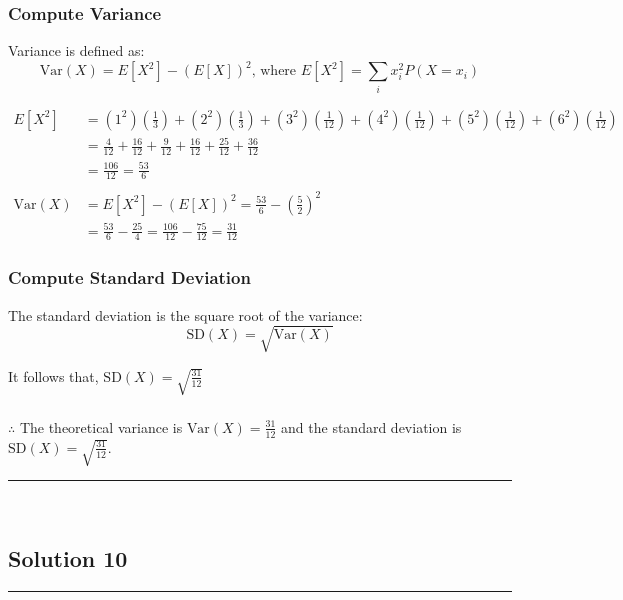 \documentclass{article}
\begin{document}
\subsubsection*{Compute Variance}

\parbox{\textwidth}{Variance is defined as:
$$\text{Var}(X) = E[X^2] - (E[X])^2\text{, where } E[X^2] = \sum_{i} x_i^2 P(X=x_i)$$ 
}
\begin{align*}
E[X^2] &= (1^2)\left(\frac{1}{3}\right) + (2^2)\left(\frac{1}{3}\right) + (3^2)\left(\frac{1}{12}\right) + (4^2)\left(\frac{1}{12}\right) + (5^2)\left(\frac{1}{12}\right) + (6^2)\left(\frac{1}{12}\right) \\
&= \frac{4}{12} + \frac{16}{12} + \frac{9}{12} + \frac{16}{12} + \frac{25}{12} + \frac{36}{12} \\
&= \frac{106}{12} = \frac{53}{6} \\
\\
\text{Var}(X) &= E[X^2] - (E[X])^2 = \frac{53}{6} - \left(\frac{5}{2}\right)^2 \\
&= \frac{53}{6} - \frac{25}{4} = \frac{106}{12} - \frac{75}{12} = \frac{31}{12} 
\end{align*}
\subsubsection*{Compute Standard Deviation}

\parbox{\textwidth}{The standard deviation is the square root of the variance:
$$\text{SD}(X) = \sqrt{\text{Var}(X)}$$

It follows that, $\text{SD}(X) = \sqrt{\frac{31}{12}}$
}
\subsubsection*{\normalfont}{$\therefore$ The theoretical variance is $\text{Var}(X) = \frac{31}{12}$ and the standard deviation is $\text{SD}(X) = \sqrt{\frac{31}{12}}$.}


\noindent\rule{\textwidth}{0.4pt}\\

\newpage

\subsection*{Solution 10}
\noindent\rule{\textwidth}{0.4pt}\\
\end{document}
